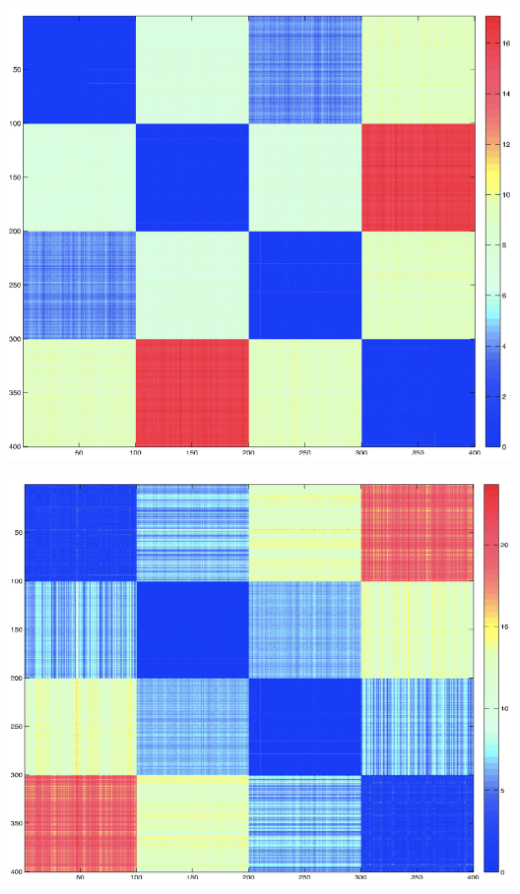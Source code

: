 \documentclass{article}
\begin{document}
\begin{center}
    \includegraphics[scale=0.5]{images/Q2P4A.png}
\end{center}

\begin{center}
    \includegraphics[scale=0.5]{images/Q2P4B.png}
\end{center}
\end{document}

